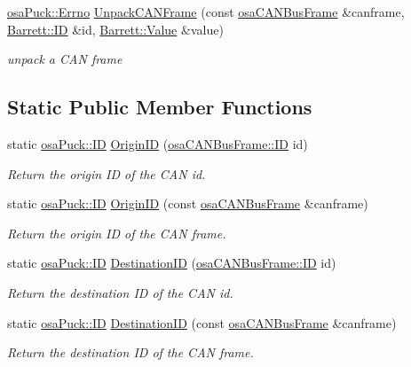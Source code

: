 \begin{DoxyCompactItemize}
\item 
\hyperlink{classosa_puck_af19c88d20083577d3a676353b4902391}{osa\-Puck\-::\-Errno} \hyperlink{classosa_puck_a87860770046d3d0ee0fe13ec41cab8bc}{Unpack\-C\-A\-N\-Frame} (const \hyperlink{classosa_c_a_n_bus_frame}{osa\-C\-A\-N\-Bus\-Frame} \&canframe, \hyperlink{struct_barrett_a317dfaed9982ffc28166e537d774bd16}{Barrett\-::\-I\-D} \&id, \hyperlink{struct_barrett_a57ff132885344ca62e4b4b691885685b}{Barrett\-::\-Value} \&value)
\begin{DoxyCompactList}\small\item\em unpack a C\-A\-N frame \end{DoxyCompactList}\end{DoxyCompactItemize}
\subsection*{Static Public Member Functions}
\begin{DoxyCompactItemize}
\item 
static \hyperlink{classosa_puck_aa484456bae759574accdc76fe68b4685}{osa\-Puck\-::\-I\-D} \hyperlink{classosa_puck_abe31686faa78be6b3feae03712c2cb58}{Origin\-I\-D} (\hyperlink{classosa_c_a_n_bus_frame_ae917bcfe6427b2055a405716909c6048}{osa\-C\-A\-N\-Bus\-Frame\-::\-I\-D} id)
\begin{DoxyCompactList}\small\item\em Return the origin I\-D of the C\-A\-N id. \end{DoxyCompactList}\item 
static \hyperlink{classosa_puck_aa484456bae759574accdc76fe68b4685}{osa\-Puck\-::\-I\-D} \hyperlink{classosa_puck_a4fd0113b6e5222c6b43f3aa6746542c2}{Origin\-I\-D} (const \hyperlink{classosa_c_a_n_bus_frame}{osa\-C\-A\-N\-Bus\-Frame} \&canframe)
\begin{DoxyCompactList}\small\item\em Return the origin I\-D of the C\-A\-N frame. \end{DoxyCompactList}\item 
static \hyperlink{classosa_puck_aa484456bae759574accdc76fe68b4685}{osa\-Puck\-::\-I\-D} \hyperlink{classosa_puck_a31ee245d345346ed269a228bf4c92219}{Destination\-I\-D} (\hyperlink{classosa_c_a_n_bus_frame_ae917bcfe6427b2055a405716909c6048}{osa\-C\-A\-N\-Bus\-Frame\-::\-I\-D} id)
\begin{DoxyCompactList}\small\item\em Return the destination I\-D of the C\-A\-N id. \end{DoxyCompactList}\item 
static \hyperlink{classosa_puck_aa484456bae759574accdc76fe68b4685}{osa\-Puck\-::\-I\-D} \hyperlink{classosa_puck_a33bc71ae2ae1b842f6f137da93be2410}{Destination\-I\-D} (const \hyperlink{classosa_c_a_n_bus_frame}{osa\-C\-A\-N\-Bus\-Frame} \&canframe)
\begin{DoxyCompactList}\small\item\em Return the destination I\-D of the C\-A\-N frame. \end{DoxyCompactList}\end{DoxyCompactItemize}
